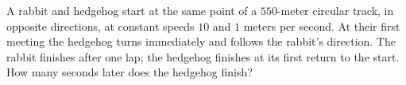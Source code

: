 A rabbit and hedgehog start at the same point of a $550$-meter circular track, in opposite directions, at constant speeds $10$ and $1$ meters per second. At their first meeting the hedgehog turns immediately and follows the rabbit's direction. The rabbit finishes after one lap; the hedgehog finishes at its first return to the start. How many seconds later does the hedgehog finish?
